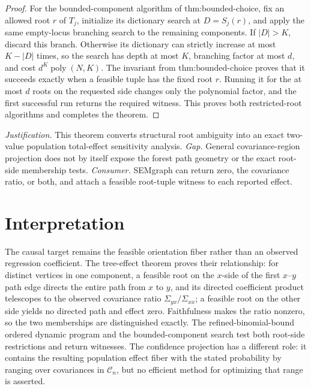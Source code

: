 \documentclass{article}
\begin{document}
\begin{proof}
For the bounded-component algorithm of \(\text{thm:bounded-choice}\), fix an allowed root \(r\) of \(T_j\), initialize its dictionary search at \(D=S_j(r)\), and apply the same empty-locus branching search to the remaining components. If \(|D|>K\), discard this branch. Otherwise its dictionary can strictly increase at most \(K-|D|\) times, so the search has depth at most \(K\), branching factor at most \(d\), and cost \(d^K\operatorname{poly}(N,K)\). The invariant from \(\text{thm:bounded-choice}\) proves that it succeeds exactly when a feasible tuple has the fixed root \(r\). Running it for the at most \(d\) roots on the requested side changes only the polynomial factor, and the first successful run returns the required witness. This proves both restricted-root algorithms and completes the theorem.
\end{proof}
\par\smallskip\noindent \textit{Justification.} This theorem converts structural root ambiguity into an exact two-value population total-effect sensitivity analysis. \textit{Gap.} General covariance-region projection does not by itself expose the forest path geometry or the exact root-side membership tests. \textit{Consumer.} SEMgraph can return zero, the covariance ratio, or both, and attach a feasible root-tuple witness to each reported effect.

\section{Interpretation}

The causal target remains the feasible orientation fiber rather than an observed regression coefficient. The tree-effect theorem proves their relationship: for distinct vertices in one component, a feasible root on the \(x\)-side of the first \(x\)--\(y\) path edge directs the entire path from \(x\) to \(y\), and its directed coefficient product telescopes to the observed covariance ratio \(\Sigma_{yx}/\Sigma_{xx}\); a feasible root on the other side yields no directed path and effect zero. Faithfulness makes the ratio nonzero, so the two memberships are distinguished exactly. The refined-binomial-bound ordered dynamic program and the bounded-component search test both root-side restrictions and return witnesses. The confidence projection has a different role: it contains the resulting population effect fiber with the stated probability by ranging over covariances in \(\mathcal C_n\), but no efficient method for optimizing that range is asserted.
\end{document}
